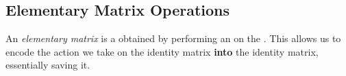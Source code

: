\subsection{Elementary Matrix Operations}\label{subsec:Elementary_Matrix_Ops}
\begin{definition}\label{def:Elementary_Matrix}
  An \emph{elementary matrix} is a  obtained by performing an  on the .
  This allows us to encode the action we take on the identity matrix \textbf{into} the identity matrix, essentially saving it.
\end{definition}


